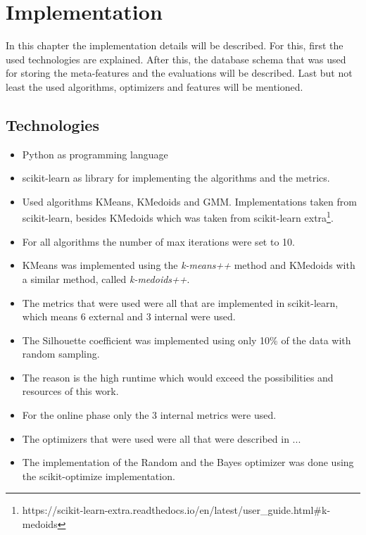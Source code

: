 \chapter{Implementation}

In this chapter the implementation details will be described.
For this, first the used technologies are explained.
After this, the database schema that was used for storing the meta-features and the evaluations will be described.
Last but not least the used algorithms, optimizers and features will be mentioned.

\section{Technologies}

\begin{itemize}
    \item Python as programming language
    \item scikit-learn \cite{PedregosaFABIANPEDREGOSA2011Scikit-learn:Perrot} as library for implementing the algorithms and the metrics.
    \item Used algorithms KMeans, KMedoids\cite{Kaufman1987ClusteringMedoids} and GMM. 
    Implementations taken from scikit-learn, besides KMedoids which was taken from scikit-learn extra\footnote{https://scikit-learn-extra.readthedocs.io/en/latest/user_guide.html#k-medoids}.
    \item For all algorithms the number of max iterations were set to 10.
    \item KMeans was implemented using the  \textit{k-means++} \cite{Arthur2007K-means++:Seeding} method
    and KMedoids with a similar method, called \textit{k-medoids++}.
    \item The metrics that were used were all that are implemented in scikit-learn, which means 6 external and 3 internal were used.
    \item The Silhouette coefficient \cite{Rousseeuw1987Silhouettes:Analysis} was implemented using only 10\% of the data with random sampling.
    \item The reason is the high runtime which would exceed the possibilities and resources of this work.
    \item For the online phase only the 3 internal metrics were used. 
    \item The optimizers that were used were all that were described in ... 
    \item The implementation of the Random and the Bayes optimizer was done using the scikit-optimize \cite{Head2018Scikit-optimize} implementation.

\end{itemize}
